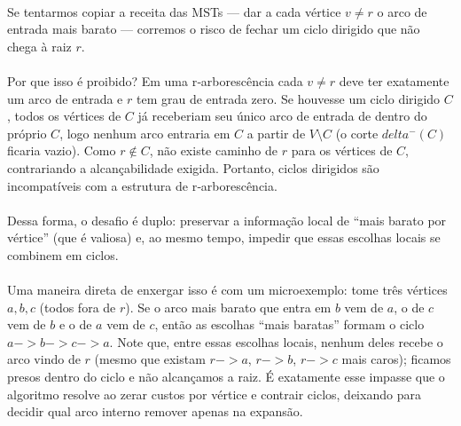 \documentclass[12pt,a4paper]{article}
\def\emph#1{#1}%
\def\to{->}%
\def\delta{delta}%
\begin{document}
\paragraph{}
Se tentarmos copiar a receita das MSTs — dar a cada vértice \(v\neq r\) o arco de entrada mais barato — corremos o risco de fechar um \emph{ciclo dirigido} que não chega à raiz \(r\). 

\paragraph{}
Por que isso é proibido? Em uma r‑arborescência cada \(v\neq r\) deve ter exatamente um arco de entrada e \(r\) tem grau de entrada zero. Se houvesse um ciclo dirigido \(C\), todos os vértices de \(C\) já receberiam seu único arco de entrada de dentro do próprio \(C\), logo nenhum arco entraria em \(C\) a partir de \(V\setminus C\) (o corte \(\delta^-(C)\) ficaria vazio). Como \(r\notin C\), não existe caminho de \(r\) para os vértices de \(C\), contrariando a alcançabilidade exigida. Portanto, ciclos dirigidos são incompatíveis com a estrutura de r‑arborescência.

\paragraph{}
Dessa forma, o desafio é duplo: preservar a informação local de “mais barato por vértice” (que é valiosa) e, ao mesmo tempo, impedir que essas escolhas locais se combinem em ciclos. 

\paragraph{}
Uma maneira direta de enxergar isso é com um microexemplo: tome três vértices \(a,b,c\) (todos fora de \(r\)). Se o arco mais barato que entra em \(b\) vem de \(a\), o de \(c\) vem de \(b\) e o de \(a\) vem de \(c\), então as escolhas “mais baratas” formam o ciclo \(a\to b\to c\to a\). Note que, entre essas escolhas locais, nenhum deles recebe o arco vindo de \(r\) (mesmo que existam \(r\to a\), \(r\to b\), \(r\to c\) mais caros); ficamos presos dentro do ciclo e não alcançamos a raiz. É exatamente esse impasse que o algoritmo resolve ao zerar custos por vértice e contrair ciclos, deixando para decidir qual arco interno remover apenas na expansão.
\end{document}

